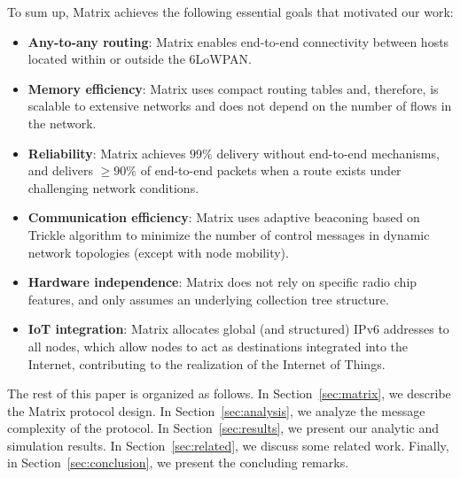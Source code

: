 To sum up, Matrix achieves the following essential goals that motivated our work:
\begin{itemize}
  \item \textbf{Any-to-any routing}: Matrix enables end-to-end connectivity between hosts located within or outside the 6LoWPAN.

  \item \textbf{Memory efficiency}: Matrix uses compact routing tables and, therefore, is scalable to extensive networks and does not depend on the number of flows in the network.

  \item \textbf{Reliability}: Matrix achieves $99\%$ delivery without end-to-end mechanisms, and delivers $\geq 90\%$ of end-to-end packets when a route exists under challenging network conditions.

  \item \textbf{Communication efficiency}: Matrix uses adaptive beaconing based on Trickle algorithm \cite{Levis:2004} to minimize the number of control messages in dynamic network topologies (except with node mobility).

  \item \textbf{Hardware independence}: Matrix does not rely on specific radio chip features, and only assumes an underlying collection tree structure.

  \item \textbf{IoT integration}: Matrix allocates global (and structured) IPv6 addresses to all nodes, which allow nodes to act as destinations integrated into the Internet, contributing to the realization of the Internet of Things.
\end{itemize}

The rest of this paper is organized as follows. In Section~\ref{sec:matrix}, we describe the Matrix protocol design. In Section~\ref{sec:analysis}, we analyze the message complexity of the protocol. In Section~\ref{sec:results}, we present our analytic and simulation results. In Section~\ref{sec:related}, we discuss some related work. Finally, in Section~\ref{sec:conclusion}, we present the concluding remarks. 